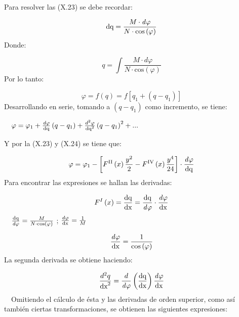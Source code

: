 \documentclass{tufte-book}
\newcommand\normalsubformula[1]{\text{\mathversion{normal}$#1$}}
\begin{document}
Para resolver las (X.23) se debe recordar:

\begin{equation*}
{\normalsubformula{\text{dq}}=\frac{M\cdot \mathit{d\varphi }}{N\cdot
\text{cos}\left(\varphi \right)}}
\end{equation*}
Donde:

\begin{equation*}
{q=\int {\frac{M\cdot \mathit{d\varphi }}{N\cdot \text{cos}\left(\varphi
\right)}}}
\end{equation*}
Por lo tanto:

\begin{equation*}
{\varphi =f\left(q\right)=f\left[q_{{1}}+\left(q-q_{{1}}\right)\right]}
\end{equation*}
Desarrollando en serie, tomando a  ${\left(q-q_{{1}}\right)}$ como
incremento, se tiene:

\ \  ${\varphi =\varphi _{{1}}+\frac{\mathit{d\varphi
}}{\normalsubformula{\text{dq}}}\left(q-q_{{1}}\right)+\frac{d^{{2}}\varphi
}{\normalsubformula{\text{dq}}^{{2}}}\left(q-q_{{1}}\right)^{{2}}+\text{.}\text{.}\text{.}}$

Y por la (X.23) y (X.24) se tiene que:

\begin{equation*}
{\varphi =\varphi
_{{1}}-\left[F^{{\normalsubformula{\text{II}}}}\left(x\right)\frac{y^{{2}}}{2}-F^{{\normalsubformula{\text{IV}}}}\left(x\right)\frac{y^{{4}}}{\text{24}}\right]\cdot
{\frac{\mathit{d\varphi }}{\normalsubformula{\text{dq}}}}}
\end{equation*}
Para encontrar las expresiones se hallan las derivadas:

\begin{equation*}
{F^{{I}}\left(x\right)=\frac{\normalsubformula{\text{dq}}}{\normalsubformula{\text{dx}}}=\frac{\normalsubformula{\text{dq}}}{\mathit{d\varphi
}}\cdot {\frac{\mathit{d\varphi }}{\normalsubformula{\text{dx}}}}}
\end{equation*}
\ \  ${\frac{\normalsubformula{\text{dq}}}{\mathit{d\varphi
}}=\frac{M}{N\cdot \text{cos}\left(\varphi \right)}}$  ;  
${\frac{\mathit{d\varphi }}{\normalsubformula{\text{dx}}}=\frac{1}{M}}$

\begin{equation*}
{\frac{\mathit{d\varphi
}}{\normalsubformula{\text{dx}}}=\frac{1}{\text{cos}\left(\varphi
\right)}}
\end{equation*}
La segunda derivada se obtiene haciendo:

\begin{equation*}
{\frac{d^{{2}}q}{\normalsubformula{\text{dx}}^{{2}}}=\frac{d}{\mathit{d\varphi
}}\left(\frac{\normalsubformula{\text{dq}}}{\normalsubformula{\text{dx}}}\right)\frac{\mathit{d\varphi
}}{\normalsubformula{\text{dx}}}}
\end{equation*}
\ \ Omitiendo el cálculo de ésta y las derivadas de orden superior,
como así también ciertas transformaciones, se obtienen las
siguientes expresiones:
\end{document}
